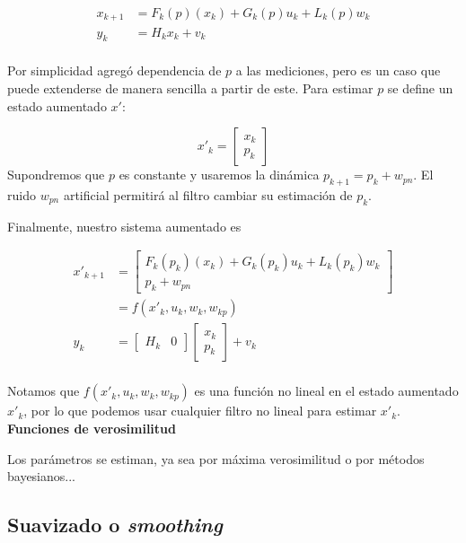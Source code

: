 \[
\begin{aligned}
x_{k+1} &= F_k(p)(x_k) + G_k(p)u_k + L_k(p)w_k \\
y_{k} &= H_k x_k + v_k \\ 
\end{aligned}
\]

Por simplicidad agregó dependencia de \(p\) a las mediciones, pero es un caso que puede extenderse de manera sencilla a partir de este. Para estimar \(p\) se define un estado aumentado \(x'\):

\[
x'_k = \begin{bmatrix}x_k \\ p_k \end{bmatrix}
\]
Supondremos que \(p\) es constante y usaremos la dinámica \(p_{k+1} = p_k + w_{pn}\). El ruido \(w_{pn}\) artificial permitirá al filtro cambiar su estimación de \(p_k\). 

Finalmente, nuestro sistema aumentado es 

\[
\begin{aligned}
x'_{k+1} &= \begin{bmatrix} F_k(p_k)(x_k) + G_k(p_k)u_k + L_k(p_k)w_k \\ p_k + w_{pn} \end{bmatrix} \\
&= f(x'_{k}, u_k, w_k, w_{kp}) \\
y_{k} &= \begin{bmatrix} H_k & 0 \end{bmatrix} \begin{bmatrix}x_k \\ p_k \end{bmatrix} + v_k \\ 
\end{aligned}
\]

Notamos que \(f(x'_{k}, u_k, w_k, w_{kp}) \) es una función no lineal en el estado aumentado \(x'_k\), por lo que podemos usar cualquier filtro no lineal para estimar \(x'_k\).\\



\noindent\textbf{Funciones de verosimilitud}

Los parámetros se estiman, ya sea por máxima verosimilitud o por métodos bayesianos... 

\subsection{Suavizado o \textit{smoothing} } \label{smoother}

